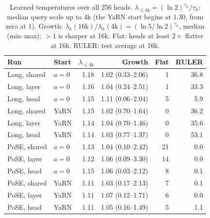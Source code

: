 \begin{table}[t]
\centering
\small
\setlength{\tabcolsep}{2.5pt}
\begin{tabular}{@{}llrrrr@{}}
\toprule
Run & Start & $\lambda_{\le 4\mathrm{k}}$ & Growth & Flat & RULER \\
\midrule
Long, shared & $a{=}0$ & 1.18 & 1.02 (0.33--2.06) & 1 & 36.8 \\
Long, layer  & $a{=}0$ & 1.16 & 1.04 (0.24--2.51) & 1 & 33.3 \\
Long, head   & $a{=}0$ & 1.15 & 1.11 (0.06--2.04) & 5 & 5.9 \\
Long, shared & YaRN & 1.15 & 1.02 (0.70--1.64) & 0 & 36.2 \\
Long, layer  & YaRN & 1.14 & 1.04 (0.70--1.46) & 0 & 35.6 \\
Long, head   & YaRN & 1.14 & 1.03 (0.77--1.37) & 0 & 53.1 \\
\midrule
PoSE, shared & $a{=}0$ & 1.13 & 1.04 (0.10--2.42) & 21 & 0.0 \\
PoSE, layer  & $a{=}0$ & 1.12 & 1.06 (0.09--3.30) & 14 & 0.0 \\
PoSE, head   & $a{=}0$ & 1.15 & 1.06 (0.03--2.12) & 8 & 0.1 \\
PoSE, shared & YaRN & 1.11 & 1.03 (0.17--2.13) & 7 & 0.1 \\
PoSE, layer  & YaRN & 1.11 & 1.07 (0.12--1.71) & 6 & 0.0 \\
PoSE, head   & YaRN & 1.11 & 1.05 (0.16--1.49) & 5 & 1.1 \\
\bottomrule
\end{tabular}
\caption{Learned temperatures over all 256 heads. $\lambda_{\le 4\mathrm{k}} = (\ln 2)^{\gamma_h}/\tau_h$: median query scale up to 4k (the YaRN start begins at 1.30, from zero at 1). Growth: $\lambda_h(16\mathrm{k})/\lambda_h(4\mathrm{k}) = (\ln 5/\ln 2)^{\gamma_h}$, median (min--max); ${>}1$ is sharper at 16k. Flat: heads at least $2\times$ flatter at 16k. RULER: test average at 16k.}
\label{tab:temp}
\end{table}
